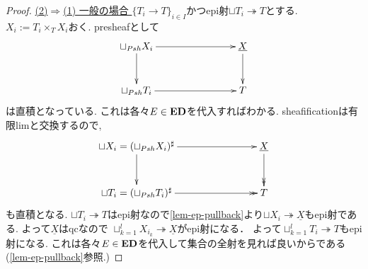 \documentclass[dvipdfmx,a4paper,11pt]{article}
\theoremstyle{definition}
\begin{document}
\begin{proof}
\underline{(2)$\Rightarrow$(1) 一般の場合 }
$\{ T_i \to T\}_{i \in I}$かつepi射$\sqcup T_i \twoheadrightarrow T$とする. 
$X_i := T_i \times_{T} X_i$おく. 
presheafとして
\begin{equation*}
\xymatrix@C=80pt@R=30pt{
\sqcup_{Psh} X_i  \ar@{->}[r]\ar@{->}[d]
&\underline{X} \ar@{->}[d] \\
\sqcup_{Psh} T_i \ar@{->}[r]
&T \\   
}
\end{equation*}
は直積となっている. 
これは各々$E \in {\bf ED}$を代入すればわかる.
sheafificationは有限limと交換するので, 
\begin{equation*}
\xymatrix@C=80pt@R=30pt{
\sqcup X_i  =(\sqcup_{Psh} X_i )^{\sharp} \ar@{->}[r]\ar@{->}[d]
&\underline{X} \ar@{->>}[d] \\
\sqcup T_i  = (\sqcup_{Psh} T_i )^{\sharp}\ar@{->>}[r]
&T \\   
}
\end{equation*}
も直積となる. 
$\sqcup T_i \twoheadrightarrow T$はepi射なので\ref{lem-ep-pullback}より$\sqcup X_i \twoheadrightarrow \underline{X}$もepi射である.
よって$\underline{X}$はqcなので
$\sqcup_{k=1}^{l} X_{i_k} \twoheadrightarrow \underline{X}$がepi射になる．
よって$\sqcup_{k=1}^{l}T_i \twoheadrightarrow T$もepi射になる.
 これは各々$E \in {\bf ED}$を代入して集合の全射を見れば良いからである(\ref{lem-ep-pullback}参照.)
 \end{proof}
 
\end{document}
